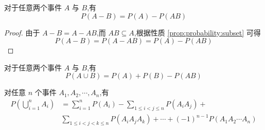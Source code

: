 \begin{property}
    \indent 对于任意两个事件 $A$ 与 $B$,有
    \begin{equation}
        P(A-B)=P(A)-P(AB)
    \end{equation}
\end{property}

\begin{proof}
    由于 $A-B=A-AB$,而 $AB \subseteq A$,根据性质 \ref{prop:probability:subset} 可得
    \[
    P(A-B)=P(A-AB)=P(A)-P(AB)
    \]
\end{proof}

\begin{property}
    \indent 对于任意两个事件 $A$ 与 $B$,有
    \begin{equation} \label{equation:add}
        P(A \cup B) = P(A) + P(B) - P(AB)
    \end{equation}

    对任意 $n$ 个事件 $A_1,A_2,\cdots,A_n$,有
    \begin{equation} \label{equation:normal add}
        \begin{aligned}
            P \left( \bigcup_{i=1}^n A_i \right) &= \sum_{i=1}^n P(A_i) - \sum_{1 \leqslant i<j \leqslant n} P(A_i A_j) + \\
            & \sum_{1 \leqslant i<j<k \leqslant n} P(A_i A_j A_k) + \cdots + (-1)^{n-1} P(A_1 A_2 \cdots A_n)
        \end{aligned}
    \end{equation}
\end{property}

